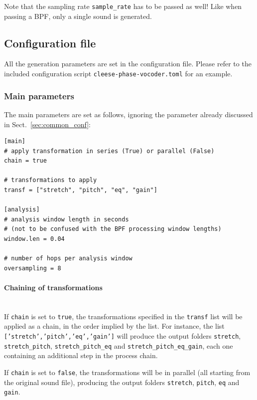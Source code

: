 \documentclass[oneside,10pt]{article}
\newcommand{\mic}{\texttt}
\begin{document}
Note that the sampling rate \texttt{sample\_rate} has to be passed as well! Like
when passing a BPF, only a single sound is generated.



\subsection{Configuration file}\label{sec:pars}

All the generation parameters are set in the configuration file. Please refer
to the included configuration script \texttt{cleese-phase-vocoder.toml} for an
example.

\subsubsection{Main parameters}

The main parameters are set as follows, ignoring the parameter already
discussed in Sect.~\ref{sec:common_conf}:

\vspace{5pt}
\begin{verbatim}
[main]
# apply transformation in series (True) or parallel (False)
chain = true

# transformations to apply
transf = ["stretch", "pitch", "eq", "gain"]

[analysis]
# analysis window length in seconds
# (not to be confused with the BPF processing window lengths)
window.len = 0.04

# number of hops per analysis window
oversampling = 8
\end{verbatim}

\paragraph*{Chaining of transformations}~\\

If \texttt{chain} is set to \mic{true}, the transformations specified in the
\texttt{transf} list will be applied as a chain, in the order implied by the
list. For instance, the list \mic{['stretch','pitch','eq','gain']} will produce
the output folders \texttt{stretch}, \texttt{stretch\_pitch},
\texttt{stretch\_pitch\_eq} and \texttt{stretch\_pitch\_eq\_gain}, each one
containing an additional step in the process chain.

If \texttt{chain} is set to \mic{false}, the transformations will be in parallel
(all starting from the original sound file), producing the output folders
\texttt{stretch}, \texttt{pitch}, \texttt{eq} and \texttt{gain}.
\end{document}
